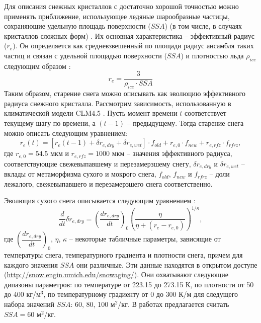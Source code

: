 \documentclass[a4paper, fontsize=14pt]{scrartcl}
\begin{document}
\newpage
Для описания снежных кристаллов с достаточно хорошой точностью можно применять приближение, использующее ледяные шарообразные частицы, сохраняющие удельную площадь поверхности ($SSA$) (в том числе, в случаях кристаллов сложных форм) \cite{Grenfell1999}. Их основная характеристика -- эффективный радиус ($r_e$). Он определяется как средневзвешенный по площади радиус ансамбля таких частиц и связан с удельной площадью поверхности ($SSA$) и плотностью льда $\rho_{ice}$ следующим образом \cite{Flanner2006}:  
\begin{equation}
    r_e = \dfrac{3} {\rho_{ice} \cdot SSA} \label{sys}
\end{equation}
Таким образом, старение снега можно описывать как эволюцию эффективного радиуса снежного кристалла. Рассмотрим зависимость, использованную в климатической модели CLM4.5 \cite{CLM4.5tech}. Пусть момент времени $t$ соответствует текущему шагу по времени, а $(t - 1)$ -- предыдущему. Тогда старение снега можно описать следующим уравнением:
\begin{equation}
    r_e(t) = [r_e (t - 1) + \delta r_{e , dry} + \delta r_{e , wet} ] \cdot f_{old} + r_{e ,0} \cdot f_{new} + r_{e , rfz} \cdot f_{rfrz}, \label{sysRDS1}
\end{equation}
где $ r_{e ,0} = 54.5 $ мкм и $r_{e , rfz} = 1000 $ мкм -- значения эффективного радиуса, соответствующие свежевыпавшему и перезамерзшему снегу, $\delta r_{e , dry}$ и $\delta r_{e , wet}$ -- вклады от метаморфизма сухого и мокрого снега, $f_{old}$, $f_{new}$ и $f_{rfrz}$ -- доли лежалого, свежевыпавшего и перезамерзшего снега соответственно.  

Эволюция сухого снега описывается следующим уравнением \cite{Flanner2007, CLM4.5tech}:
\begin{equation}
    \dfrac{d}{dt} \delta r_{e , dry} = {\left( \dfrac{dr_{e , dry}}{dt} \right)}_0 \left(\dfrac{\eta}{\eta + (r_e - r_{e, 0})}\right)^{1 / \kappa}, \label{sys}
\end{equation}
где ${\left( \dfrac{dr_{e , dry}}{dt} \right)}_0$, $\eta$, $\kappa$ -- некоторые табличные параметры, зависящие от температуры снега, температурного градиента и плотности снега, причем для каждого значения $SSA$ они различные. Эти данные находятся в открытом доступе (\url{http://snow.engin.umich.edu/snowaging/}). Они охватывают следующие дипазоны параметров: по температуре от 223.15 до 273.15 К, по плотности от 50 до 400 кг/м$^3$, по температурному градиенту от 0 до 300 К/м для следущего набора значений $SSA$: 60, 80, 100 м$^2$/кг. В работах \cite{CLM4.5tech, Flanner2006, Flanner2007} предлагается считать $SSA = 60$ м$^2$/кг.
\end{document}
